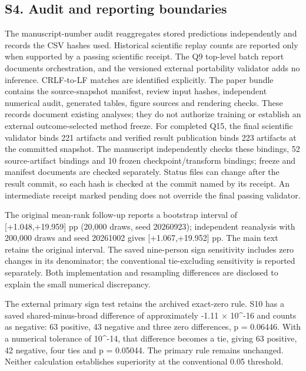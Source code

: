 \documentclass[11pt]{article}
\begin{document}
\subsection*{S4. Audit and reporting boundaries}
The manuscript-number audit reaggregates stored predictions independently and records the CSV hashes used. Historical scientific replay counts are reported only when supported by a passing scientific receipt. The Q9 top-level batch report documents orchestration, and the versioned external portability validator adds no inference. CRLF-to-LF matches are identified explicitly. The paper bundle contains the source-snapshot manifest, review input hashes, independent numerical audit, generated tables, figure sources and rendering checks. These records document existing analyses; they do not authorize training or establish an external outcome-selected method freeze. For completed Q15, the final scientific validator binds 221 artifacts and verified result publication binds 223 artifacts at the committed snapshot. The manuscript independently checks these bindings, 52 source-artifact bindings and 10 frozen checkpoint/transform bindings; freeze and manifest documents are checked separately. Status files can change after the result commit, so each hash is checked at the commit named by its receipt. An intermediate receipt marked pending does not override the final passing validator.

The original mean-rank follow-up reports a bootstrap interval of [+1.048,+19.959] pp (20,000 draws, seed 20260923); independent reanalysis with 200,000 draws and seed 20261002 gives [+1.067,+19.952] pp. The main text retains the original interval. The saved nine-person sign sensitivity includes zero changes in its denominator; the conventional tie-excluding sensitivity is reported separately. Both implementation and resampling differences are disclosed to explain the small numerical discrepancy.

The external primary sign test retains the archived exact-zero rule. S10 has a saved shared-minus-broad difference of approximately -1.11 $\times$ 10\textasciicircum{}-16 and counts as negative: 63 positive, 43 negative and three zero differences, p = 0.06446. With a numerical tolerance of 10\textasciicircum{}-14, that difference becomes a tie, giving 63 positive, 42 negative, four ties and p = 0.05044. The primary rule remains unchanged. Neither calculation establishes superiority at the conventional 0.05 threshold.
\end{document}
